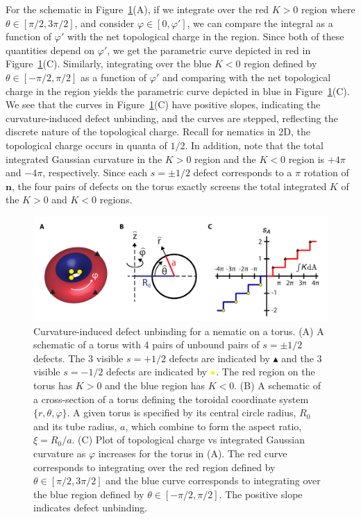 For the schematic in Figure~\ref{f:3-EqDefs}(A), if we integrate over the red $K>0$ region where $\theta \in [\pi/2,3 \pi/2]$, and consider $\varphi \in [0,\varphi']$, we can compare the integral as a function of $\varphi'$ with the net topological charge in the region.
Since both of these quantities depend on $\varphi'$, we get the parametric curve depicted in red in Figure~\ref{f:3-EqDefs}(C).
Similarly, integrating over the blue $K<0$ region defined by $\theta \in [-\pi/2,\pi/2]$ as a function of $\varphi'$ and comparing with the net topological charge in the region yields the parametric curve depicted in blue in Figure~\ref{f:3-EqDefs}(C).
We see that the curves in Figure~\ref{f:3-EqDefs}(C) have positive slopes, indicating the curvature-induced defect unbinding, and the curves are stepped, reflecting the discrete nature of the topological charge.
Recall for nematics in 2D, the topological charge occurs in quanta of $1/2$.
In addition, note that the total integrated Gaussian curvature in the $K>0$ region and the $K<0$ region is $+4 \pi$ and $-4\pi$, respectively.
Since each $s = \pm 1/2$ defect corresponds to a $\pi$ rotation of $\mathbf{n}$, the four pairs of defects on the torus exactly screens the total integrated $K$ of the $K > 0$ and $K<0$ regions.
\begin{figure}
  \includegraphics{figures/C3/Ch3-Figs_EqDefs.png}
  \caption{Curvature-induced defect unbinding for a nematic on a torus. (A) A schematic of a torus with 4 pairs of unbound pairs of $s = \pm 1/2$ defects. The 3 visible $s=+1/2$ defects are indicated by $\blacktriangle$ and the 3 visible $s = -1/2$ defects are indicated by ${\color{yellow} \bullet}$.
  The red region on the torus has $K >0$ and the blue region has $K<0$.
  (B) A schematic of a cross-section of a torus defining the toroidal coordinate system $\{r, \theta, \varphi \}$.
  A given torus is specified by its central circle radius, $R_0$ and its tube radius, $a$, which combine to form the aspect ratio, $\xi = R_0/a$.
  (C) Plot of topological charge vs integrated Gaussian curvature as $\varphi$ increases for the torus in (A).
  The red curve corresponds to integrating over the red region defined by $\theta \in [\pi/2,3 \pi/2]$ and the blue curve corresponds to integrating over the blue region defined by $\theta \in [-\pi/2,\pi/2]$. The positive slope indicates defect unbinding.}\label{f:3-EqDefs}
\end{figure}

